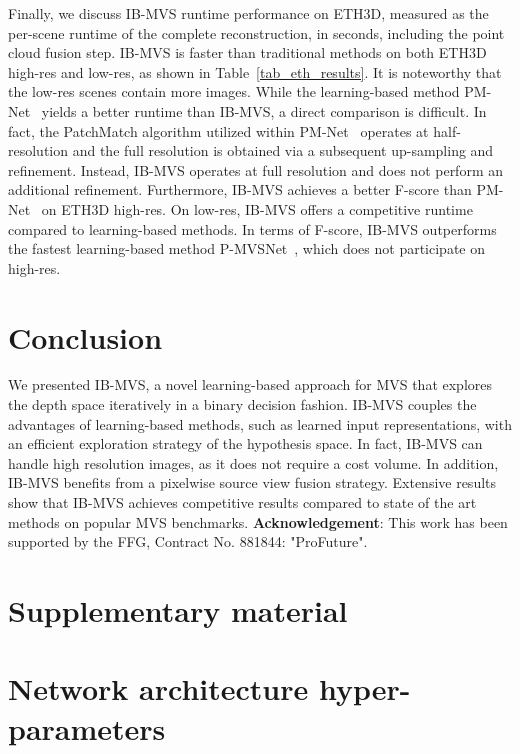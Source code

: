 \documentclass{bmvc2k}
\begin{document}
Finally, we discuss IB-MVS runtime performance on ETH3D, measured as the per-scene runtime of the complete reconstruction, in seconds, including the point cloud fusion step.
IB-MVS is faster than traditional methods on both ETH3D high-res and low-res, as shown in Table~\ref{tab_eth_results}. It is noteworthy that the low-res scenes contain more images.
While the learning-based method PM-Net~\cite{patchmatchnet} yields a better runtime than IB-MVS, a direct comparison is difficult. In fact, the PatchMatch algorithm utilized within PM-Net~\cite{patchmatchnet} operates at half-resolution and the full resolution is obtained via a subsequent up-sampling and refinement.
Instead, IB-MVS operates at full resolution and does not perform an additional refinement. Furthermore, IB-MVS achieves a better F-score than PM-Net~\cite{patchmatchnet} on ETH3D high-res.
On low-res, IB-MVS offers a competitive runtime compared to learning-based methods. In terms of F-score, IB-MVS outperforms the fastest learning-based method P-MVSNet~\cite{pmvsnet}, which does not participate on high-res.
\vspace{-10pt}
\section{Conclusion}
We presented IB-MVS, a novel learning-based approach for MVS that explores the depth space iteratively in a binary decision fashion.
IB-MVS couples the advantages of learning-based methods, such as learned input representations, with an efficient exploration strategy of the hypothesis space.
In fact, IB-MVS can handle high resolution images, as it does not require a cost volume.
In addition, IB-MVS benefits from a pixelwise source view fusion strategy.
Extensive results show that IB-MVS achieves competitive results compared to state of the art methods on popular MVS benchmarks. \textbf{Acknowledgement}: This work has been supported by the FFG, Contract No. 881844: "ProFuture". 

\FloatBarrier

\setcounter{secnumdepth}{0}

\section{Supplementary material}

\renewcommand\thesection{\Alph{section}}
\setcounter{secnumdepth}{10}
\setcounter{section}{0}


\section{Network architecture hyper-parameters}
\end{document}

